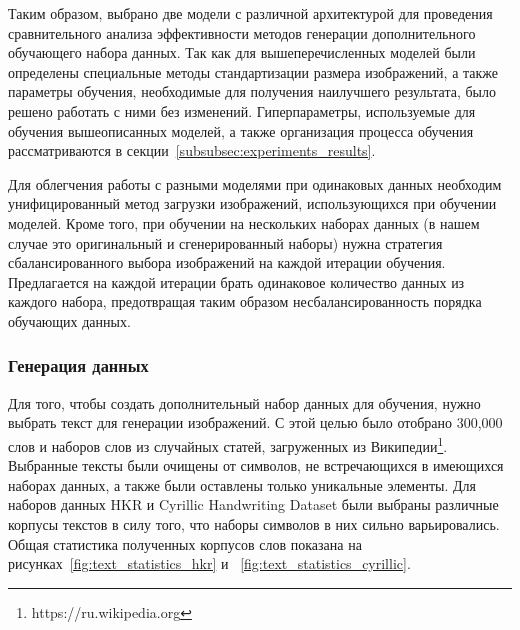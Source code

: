 Таким образом, выбрано две модели с различной архитектурой для проведения сравнительного анализа эффективности методов генерации дополнительного обучающего набора данных.
Так как для вышеперечисленных моделей были определены специальные методы стандартизации размера изображений, а также параметры обучения,
необходимые для получения наилучшего результата, было решено работать с ними без изменений.
Гиперпараметры, используемые для обучения вышеописанных моделей, а также организация процесса обучения рассматриваются в секции~\ref{subsubsec:experiments_results}.

Для облегчения работы с разными моделями при одинаковых данных необходим унифицированный метод загрузки изображений, использующихся при обучении моделей.
Кроме того, при обучении на нескольких наборах данных (в нашем случае это оригинальный и сгенерированный наборы) нужна
стратегия сбалансированного выбора изображений на каждой итерации обучения.
Предлагается на каждой итерации брать одинаковое количество данных из каждого набора,
предотвращая таким образом несбалансированность порядка обучающих данных.

\subsubsection{Генерация данных}
\label{subsubsec:data_generation}

Для того, чтобы создать дополнительный набор данных для обучения, нужно выбрать текст для генерации изображений.
С этой целью было отобрано 300,000 слов и наборов слов из случайных статей, загруженных из Википедии\footnote{https://ru.wikipedia.org}.
Выбранные тексты были очищены от символов, не встречающихся в имеющихся наборах данных, а также были оставлены только уникальные элементы.
Для наборов данных HKR и Cyrillic Handwriting Dataset были выбраны различные корпусы текстов в силу того, что наборы символов в них сильно варьировались.
Общая статистика полученных корпусов слов показана на рисунках~\ref{fig:text_statistics_hkr} и ~\ref{fig:text_statistics_cyrillic}.

